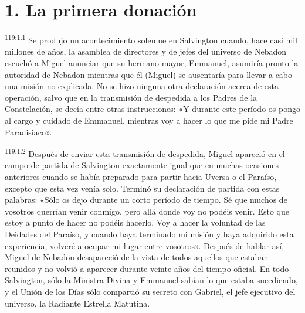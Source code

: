 \section*{1. La primera donación}
\par
\textsuperscript{119:1.1} Se produjo un acontecimiento solemne en Salvington cuando, hace casi mil millones de años, la asamblea de directores y de jefes del universo de Nebadon escuchó a Miguel anunciar que su hermano mayor, Emmanuel, asumiría pronto la autoridad de Nebadon mientras que él (Miguel) se ausentaría para llevar a cabo una misión no explicada. No se hizo ninguna otra declaración acerca de esta operación, salvo que en la transmisión de despedida a los Padres de la Constelación, se decía entre otras instrucciones: «Y durante este período os pongo al cargo y cuidado de Emmanuel, mientras voy a hacer lo que me pide mi Padre Paradisiaco».

\par
\textsuperscript{119:1.2} Después de enviar esta transmisión de despedida, Miguel apareció en el campo de partida de Salvington exactamente igual que en muchas ocasiones anteriores cuando se había preparado para partir hacia Uversa o el Paraíso, excepto que esta vez venía solo. Terminó su declaración de partida con estas palabras: «Sólo os dejo durante un corto período de tiempo. Sé que muchos de vosotros querrían venir conmigo, pero allá donde voy no podéis venir. Esto que estoy a punto de hacer no podéis hacerlo. Voy a hacer la voluntad de las Deidades del Paraíso, y cuando haya terminado mi misión y haya adquirido esta experiencia, volveré a ocupar mi lugar entre vosotros». Después de hablar así, Miguel de Nebadon desapareció de la vista de todos aquellos que estaban reunidos y no volvió a aparecer durante veinte años del tiempo oficial. En todo Salvington, sólo la Ministra Divina y Emmanuel sabían lo que estaba sucediendo, y el Unión de los Días sólo compartió su secreto con Gabriel, el jefe ejecutivo del universo, la Radiante Estrella Matutina.

